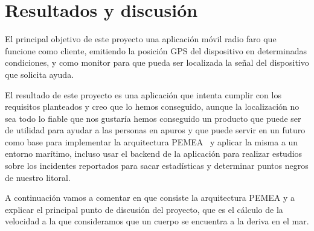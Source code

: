 \chapter{Resultados y discusión}
\label{resultados}


El principal objetivo de este proyecto una aplicación móvil radio faro que
 funcione como cliente, emitiendo la posición GPS del dispositivo en
 determinadas condiciones, y como monitor para que pueda ser
 localizada la señal del dispositivo que solicita ayuda.

El resultado de este proyecto es una aplicación que intenta cumplir 
con los requisitos planteados y creo que lo hemos conseguido, aunque
 la localización no sea todo lo fiable que nos gustaría hemos conseguido 
un producto que puede ser de utilidad para ayudar a las personas
 en apuros y que puede servir en un futuro como base para implementar
 la arquitectura PEMEA~\cite{PEMEA} y aplicar la misma a un entorno
 marítimo, incluso usar el backend de la aplicación para realizar estudios
 sobre los incidentes reportados para sacar estadísticas y determinar
 puntos negros de nuestro litoral.

A continuación vamos a comentar en que consiste la arquitectura PEMEA
 y a explicar el principal punto de discusión del proyecto, que es el cálculo
 de la velocidad a la que consideramos que un cuerpo se encuentra a la
 deriva en el mar.


